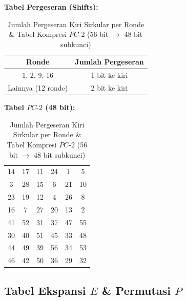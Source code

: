 \documentclass[11pt,a4paper]{article}
\begin{document}
\begin{table}[H]
\centering
\caption{Jumlah Pergeseran Kiri Sirkular per Ronde \& Tabel Kompresi $PC\text{-}2$ (56 bit $\to$ 48 bit subkunci)}
\vspace{0.2cm}
\begin{minipage}{0.45\textwidth}
\centering
\textbf{Tabel Pergeseran (Shifts):}
\begin{tabular}{cc}
\toprule
\textbf{Ronde} & \textbf{Jumlah Pergeseran} \\
\midrule
1, 2, 9, 16 & 1 bit ke kiri \\
Lainnya (12 ronde) & 2 bit ke kiri \\
\bottomrule
\end{tabular}
\end{minipage}
\hfill
\begin{minipage}{0.5\textwidth}
\centering
\textbf{Tabel $PC\text{-}2$ (48 bit):}
\begin{tabular}{|cccccc|}
\hline
14 & 17 & 11 & 24 & 1  & 5  \\
3  & 28 & 15 & 6  & 21 & 10 \\
23 & 19 & 12 & 4  & 26 & 8  \\
16 & 7  & 27 & 20 & 13 & 2  \\
41 & 52 & 31 & 37 & 47 & 55 \\
30 & 40 & 51 & 45 & 33 & 48 \\
44 & 49 & 39 & 56 & 34 & 53 \\
46 & 42 & 50 & 36 & 29 & 32 \\
\hline
\end{tabular}
\end{minipage}
\end{table}

\subsection{Tabel Ekspansi $E$ \& Permutasi $P$}
\end{document}
